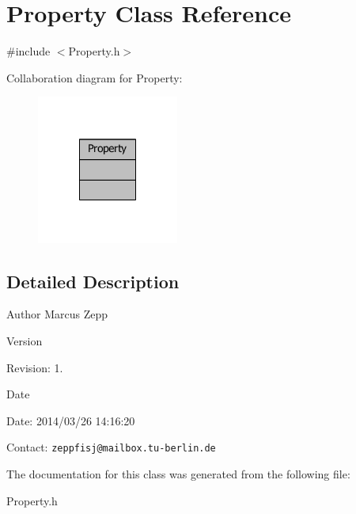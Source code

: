 \section{Property Class Reference}
\label{classProperty}


{\ttfamily \#include $<$Property.\-h$>$}



Collaboration diagram for Property\-:
\nopagebreak
\begin{figure}[H]
\begin{center}
\leavevmode
\includegraphics[width=132pt]{d3/dfb/classProperty__coll__graph}
\end{center}
\end{figure}


\subsection{Detailed Description}
\begin{DoxyAuthor}{Author}
Marcus Zepp
\end{DoxyAuthor}
\begin{DoxyVersion}{Version}

\end{DoxyVersion}
\begin{DoxyParagraph}{Revision\-:}
1. 
\end{DoxyParagraph}


\begin{DoxyDate}{Date}

\end{DoxyDate}
\begin{DoxyParagraph}{Date\-:}
2014/03/26 14\-:16\-:20 
\end{DoxyParagraph}


Contact\-: {\tt zeppfisj@mailbox.\-tu-\/berlin.\-de} 

The documentation for this class was generated from the following file\-:\begin{DoxyCompactItemize}
\item 
Property.\-h\end{DoxyCompactItemize}
